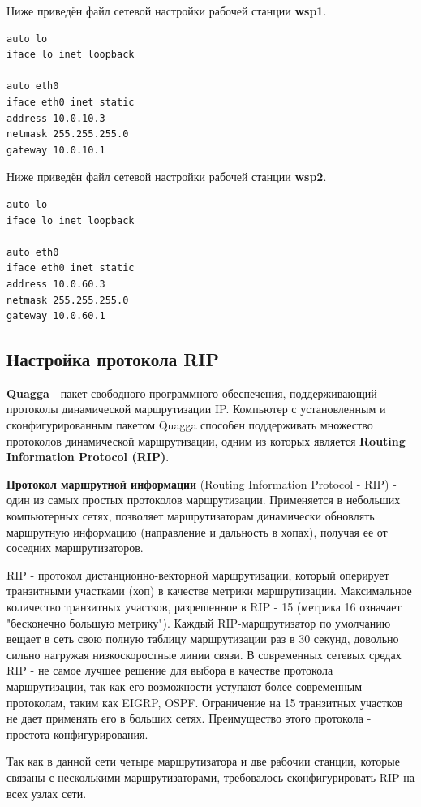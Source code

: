 \documentclass[a4paper,12pt]{article}
\begin{document}
Ниже приведён файл сетевой настройки рабочей станции \textbf{wsp1}.

\begin{Verbatim}
auto lo
iface lo inet loopback

auto eth0
iface eth0 inet static
address 10.0.10.3
netmask 255.255.255.0
gateway 10.0.10.1
\end{Verbatim}

Ниже приведён файл сетевой настройки рабочей станции \textbf{wsp2}.

\begin{Verbatim}
auto lo
iface lo inet loopback

auto eth0
iface eth0 inet static
address 10.0.60.3
netmask 255.255.255.0
gateway 10.0.60.1
\end{Verbatim}


\subsection{Настройка протокола RIP}

\textbf{Quagga} - пакет свободного программного обеспечения, поддерживающий протоколы динамической маршрутизации IP. Компьютер с установленным и сконфигурированным пакетом Quagga способен поддерживать множество протоколов динамической маршрутизации, одним из которых является \textbf{Routing Information Protocol (RIP)}.

\textbf{Протокол маршрутной информации} (Routing Information Protocol - RIP) - один из самых простых протоколов маршрутизации. Применяется в небольших компьютерных сетях, позволяет маршрутизаторам динамически обновлять маршрутную информацию (направление и дальность в хопах), получая ее от соседних маршрутизаторов.

RIP - протокол дистанционно-векторной маршрутизации, который оперирует транзитными участками (хоп) в качестве метрики маршрутизации. Максимальное количество транзитных участков, разрешенное в RIP - 15 (метрика 16 означает "бесконечно большую метрику"). Каждый RIP-маршрутизатор по умолчанию вещает в сеть свою полную таблицу маршрутизации раз в 30 секунд, довольно сильно нагружая низкоскоростные линии связи. В современных сетевых средах RIP - не самое лучшее решение для выбора в качестве протокола маршрутизации, так как его возможности уступают более современным протоколам, таким как EIGRP, OSPF. Ограничение на 15 транзитных участков не дает применять его в больших сетях. Преимущество этого протокола - простота конфигурирования.

Так как в данной сети четыре маршрутизатора и две рабочии станции, которые связаны с несколькими маршрутизаторами, требовалось сконфигурировать RIP на всех узлах сети.
\end{document}
